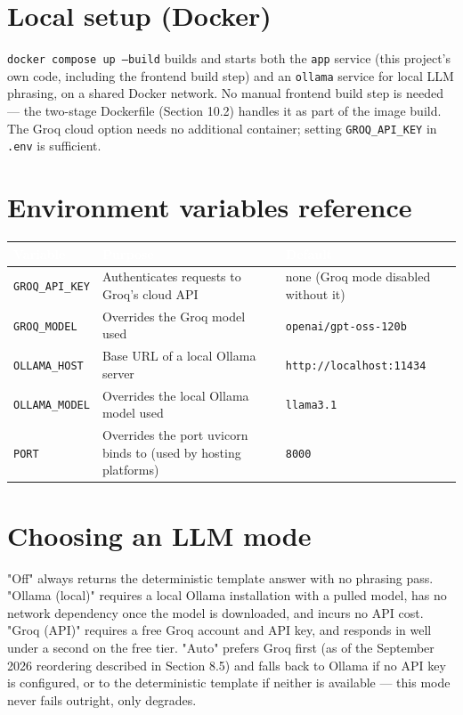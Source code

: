 \section{Local setup (Docker)}
\texttt{docker compose up --build} builds and starts both the \texttt{app} service (this project's own code, including the frontend build step) and an \texttt{ollama} service for local LLM phrasing, on a shared Docker network. No manual frontend build step is needed — the two-stage Dockerfile (Section 10.2) handles it as part of the image build. The Groq cloud option needs no additional container; setting \texttt{GROQ\_\allowbreak{}API\_\allowbreak{}KEY} in \texttt{.env} is sufficient.

\section{Environment variables reference}
\begin{longtable}{|p{}|p{}|p{}|}
\hline
\rowcolor{thesisgreen}\textcolor{white}{\textbf{Variable}} & \textcolor{white}{\textbf{Purpose}} & \textcolor{white}{\textbf{Default}} \\
\hline\endhead
\texttt{GROQ\_\allowbreak{}API\_\allowbreak{}KEY} & Authenticates requests to Groq's cloud API & none (Groq mode disabled without it) \\
\hline
\texttt{GROQ\_\allowbreak{}MODEL} & Overrides the Groq model used & \texttt{openai/\allowbreak{}gpt-oss-120b} \\
\hline
\texttt{OLLAMA\_\allowbreak{}HOST} & Base URL of a local Ollama server & \texttt{http:/\allowbreak{}/\allowbreak{}localhost:11434} \\
\hline
\texttt{OLLAMA\_\allowbreak{}MODEL} & Overrides the local Ollama model used & \texttt{llama3.1} \\
\hline
\texttt{PORT} & Overrides the port uvicorn binds to (used by hosting platforms) & \texttt{8000} \\
\hline
\end{longtable}
\section{Choosing an LLM mode}
"Off" always returns the deterministic template answer with no phrasing pass. "Ollama (local)" requires a local Ollama installation with a pulled model, has no network dependency once the model is downloaded, and incurs no API cost. "Groq (API)" requires a free Groq account and API key, and responds in well under a second on the free tier. "Auto" prefers Groq first (as of the September 2026 reordering described in Section 8.5) and falls back to Ollama if no API key is configured, or to the deterministic template if neither is available — this mode never fails outright, only degrades.

